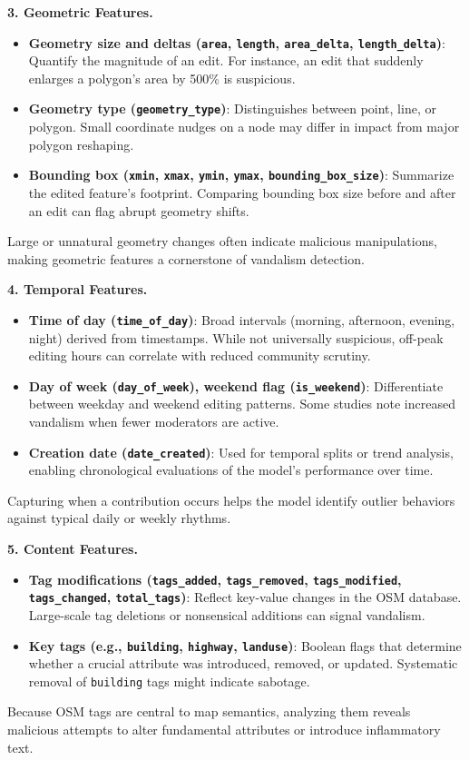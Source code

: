 \documentclass[
    13pt, %
    a4paper, %
    DIV14, %
    listof=totoc, %
    bibliography=totoc, %
    index=totoc, %
    headsepline
]{scrreprt}
\begin{document}
\vspace{1em}
\noindent
\textbf{3. Geometric Features.}
\begin{itemize}
  \item \textbf{Geometry size and deltas (\texttt{area}, \texttt{length}, \texttt{area\_delta}, \texttt{length\_delta})}: Quantify the magnitude of an edit. For instance, an edit that suddenly enlarges a polygon’s area by 500\% is suspicious.
  \item \textbf{Geometry type (\texttt{geometry\_type})}: Distinguishes between point, line, or polygon. Small coordinate nudges on a node may differ in impact from major polygon reshaping.
  \item \textbf{Bounding box (\texttt{xmin}, \texttt{xmax}, \texttt{ymin}, \texttt{ymax}, \texttt{bounding\_box\_size})}: Summarize the edited feature’s footprint. Comparing bounding box size before and after an edit can flag abrupt geometry shifts.
\end{itemize}
Large or unnatural geometry changes often indicate malicious manipulations, making geometric features a cornerstone of vandalism detection.

\vspace{1em}
\noindent
\textbf{4. Temporal Features.}
\begin{itemize}
  \item \textbf{Time of day (\texttt{time\_of\_day})}: Broad intervals (morning, afternoon, evening, night) derived from timestamps. While not universally suspicious, off-peak editing hours can correlate with reduced community scrutiny.
  \item \textbf{Day of week (\texttt{day\_of\_week}), weekend flag (\texttt{is\_weekend})}: Differentiate between weekday and weekend editing patterns. Some studies note increased vandalism when fewer moderators are active.
  \item \textbf{Creation date (\texttt{date\_created})}: Used for temporal splits or trend analysis, enabling chronological evaluations of the model’s performance over time.
\end{itemize}
Capturing when a contribution occurs helps the model identify outlier behaviors against typical daily or weekly rhythms.

\vspace{1em}
\noindent
\textbf{5. Content Features.}
\begin{itemize}
  \item \textbf{Tag modifications (\texttt{tags\_added}, \texttt{tags\_removed}, \texttt{tags\_modified}, \texttt{tags\_changed}, \texttt{total\_tags})}: Reflect key-value changes in the OSM database. Large-scale tag deletions or nonsensical additions can signal vandalism.
  \item \textbf{Key tags (e.g., \texttt{building}, \texttt{highway}, \texttt{landuse})}: Boolean flags that determine whether a crucial attribute was introduced, removed, or updated. Systematic removal of \texttt{building} tags might indicate sabotage.
\end{itemize}
Because OSM tags are central to map semantics, analyzing them reveals malicious attempts to alter fundamental attributes or introduce inflammatory text.
\end{document}
